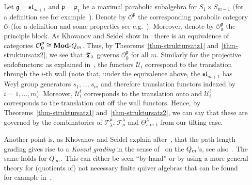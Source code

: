 \begin{rem}\label{rem-cato}
Let $\mathfrak{g}=\mathfrak{sl}_{m+1}$ and 
$\mathfrak{p}=\mathfrak{p}_1$ be a maximal 
parabolic subalgebra for $S_1\times S_{m-1}$ 
(for a definition see for example~\cite[Chapter~9]{hum}). 
Denote by $\mathcal O^{\mathfrak{p}}$ the corresponding 
parabolic category $\mathcal O$ (for a definition and 
some properties see e.g.~\cite[Section~9.3]{hum}). Moreover, 
denote by $\mathcal O^{\mathfrak{p}}_0$ the principle block. 
As Khovanov and Seidel show in~\cite[Proposition~2.9]{ks1} 
there is an equivalence of categories 
$\mathcal O^{\mathfrak{p}}_0\cong \boldsymbol{\mathrm{Mod}}\text{-}Q_m$. 
Thus, by Theorems~\ref{thm-struktursatz1} 
and~\ref{thm-struktursatz2}, we see that 
$\boldsymbol{\mathfrak{T}}_{\lambda}$ governs $\mathcal O^{\mathfrak{p}}_0$ for all $m$.
Similarly for the projective endofunctors: 
as explained in~\cite[below Proposition~2.9]{ks1}, 
the functors $\mathcal U_i$ correspond to the translation 
through the $i$-th wall (note that, under the equivalence 
above, the $\mathfrak{sl}_{m+1}$ has Weyl group generators 
$s_1,\dots,s_m$ and therefore translation functors indexed 
by $i=1,\dots,m$). Moreover, $\mathcal U_i^t$ corresponds 
to the translation onto and $\mathcal U^i_t$ corresponds to 
the translation out off the wall functors.
Hence, by Theorems~\ref{thm-struktursatz1} 
and~\ref{thm-struktursatz2}, we can say 
that these are governed by the combinatorics 
of $\mathcal T_{\lambda}^{\mu}$, 
$\mathcal T^{\lambda}_{\mu}$ 
and $\Theta^{\lambda}_{s\text{ or }t}$ from our tilting case.



Another point is, as Khovanov and Seidel explain 
after~\cite[Proposition~2.9]{ks1}, that the path length grading gives rise 
to a \textit{Koszul grading} in the sense of~\cite{bgs} on 
the $Q_{m}$'s, see also~\cite[Example~1.1]{st1}. 
The same holds for $Q_{\infty}$. This can either be 
seen ``by hand'' or by using a more general 
theory for (quotients of) not necessary 
finite quiver algebras that can be found for example in~\cite{mos}.
\end{rem}




